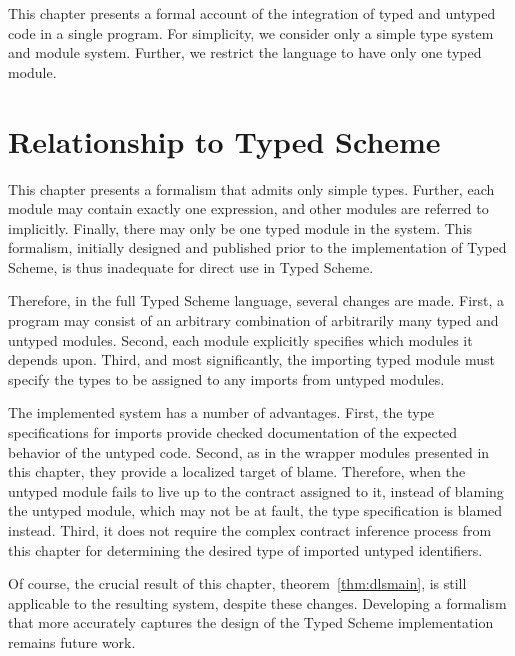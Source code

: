 \newbfop{}
\def\ii{\dlsproctype{\dlsint}{\dlsint}}

\begin{schemeregion}

This chapter presents a formal account of the integration of typed and
untyped code  in a single program.  For simplicity, we consider only a
simple type system and module system.  Further, we restrict the
language to have only one typed module.  

\section{Relationship to Typed Scheme}


This chapter presents a formalism that admits only simple types.
Further, each module may contain exactly one expression, and other modules
are referred to implicitly.  Finally, there may only be one typed
module in the system.  This formalism, initially designed and
published prior to the implementation of Typed Scheme, is thus
inadequate for direct use in Typed Scheme. 

Therefore, in the full Typed Scheme language, several changes are
made.  First, a program may consist of an arbitrary combination of
arbitrarily many typed and untyped modules.  Second, each module
explicitly specifies which modules it depends upon.  Third, and most
significantly, the importing typed module must specify the types to be
assigned to any imports from untyped modules.  

The implemented system has a number of advantages.  First, the type
specifications for imports provide checked documentation of the
expected behavior of the untyped code.  Second, as in the wrapper
modules presented in this chapter, they provide a localized target of
blame.  Therefore, when the untyped module fails to live up to the
contract assigned to it, instead of blaming the untyped module, which
may not be at fault, the type specification is blamed instead.  Third,
it does not require the complex contract inference process from this
chapter for determining the desired type of imported untyped identifiers.  

Of course, the crucial result of this chapter,
theorem~\ref{thm:dlsmain}, is still applicable to the resulting
system, despite these changes.  Developing a formalism that more
accurately captures the design of the Typed Scheme implementation
remains  future work.


\end{schemeregion}
